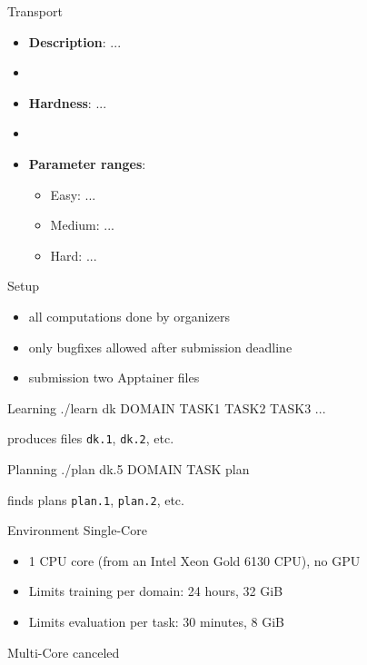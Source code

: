 \documentclass[aspectratio=169,xcolor=dvipsnames]{beamer}
\begin{document}
\begin{frame}{Transport}

    \begin{itemize}
        \item \textbf{Description}: ...
        \item[]
        \item \textbf{Hardness}: ...
        \item[]
        \item \textbf{Parameter ranges}:
        \begin{itemize}
            \item Easy: ...
            \item Medium: ...
            \item Hard: ...
        \end{itemize}
    \end{itemize}

\end{frame}

\begin{frame}{Setup}
    \begin{itemize}
        \item all computations done by organizers
        \item only bugfixes allowed after submission deadline
        \item submission two Apptainer files
    \end{itemize}

    \begin{block}{Learning}
        ./learn dk DOMAIN TASK1 TASK2 TASK3 ...
    \end{block}

    produces files \texttt{dk.1}, \texttt{dk.2}, etc.

    \begin{exampleblock}{Planning}
        ./plan dk.5 DOMAIN TASK plan
    \end{exampleblock}

    finds plans \texttt{plan.1}, \texttt{plan.2}, etc.
\end{frame}

\begin{frame}{Environment}
    Single-Core
    \begin{itemize}
        \item 1 CPU core (from an Intel Xeon Gold 6130 CPU), no GPU
        \item Limits \alert{training} per domain: 24 hours, 32 GiB
        \item Limits \alert{evaluation} per task: 30 minutes, 8 GiB
    \end{itemize}

    \bigskip
    Multi-Core canceled
\end{frame}
\end{document}
